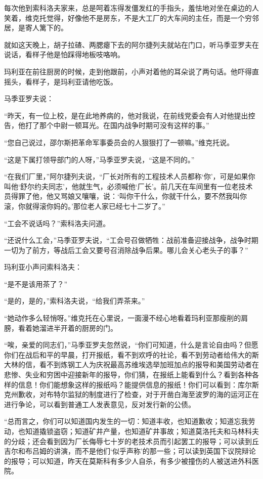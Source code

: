 每次他到索科洛夫家来，总是呵着冻得发僵发红的手指头，羞怯地对坐在桌边的人笑着，维克托觉得，好像他不是房东，不是大工厂的大车间的主任，而是一个穷邻居，是寄人篱下的。

就如这天晚上，胡子拉碴、两腮瘪下去的阿尔捷列夫就站在门口，听马季亚罗夫在说话，看样子他是怕踩得地板吱咯响。

玛利亚在前往厨房的时候，走到他跟前，小声对着他的耳朵说了两句话。他吓得直摇头，看样子，是玛利亚请他吃饭。

马季亚罗夫说：

“昨天，有一位上校，是在此地养病的，他对我说，在前线党委会有人对他提出控告，他打了那个中尉一顿耳光。在国内战争时期可没有这样的事。”

“您自己说过，邵尔斯把革命军事委员会的人狠狠打了一顿嘛。”维克托说。

“这是下属打领导部门的人呀，”马季亚罗夫说，“这是不同的。”

“在我们厂里，”阿尔捷列夫说，“厂长对所有的工程技术人员都称‘你’，可是如果你叫他‘舒尔约夫同志’，他就生气，必须喊他‘厂长’。前几天在车间里有一位老技术员得罪了他，他又骂娘又嚷嚷，说：‘叫你干什么，你就干什么，要不然我叫你滚，你就得滚你妈的。’那位老人家已经七十二岁了。”

“工会不说话吗？”索科洛夫问道。

“还说什么工会，”马季亚罗夫说，“工会号召做牺牲：战前准备迎接战争，战争时期一切为了前方，等战后工会又要号召消除战争后果。哪儿会关心老头子的事？”

玛利亚小声问索科洛夫：

“是不是该用茶了？”

“是的，是的，”索科洛夫说，“给我们弄茶来。”

“她动作多么轻悄呀。”维克托在心里说，一面漫不经心地看着玛利亚那瘦削的肩膀，看着她溜进半开着的厨房的门。

“唉，亲爱的同志们，”马季亚罗夫忽然说，“你们可知道，什么是言论自由吗？但愿你们在战后和平的早晨，打开报纸，看不到欢呼的社论，看不到劳动者给伟大的斯大林的信，看不到炼钢工人为庆祝最高苏维埃选举加班加点的报导和美国劳动者在悲惨、失业和穷困中迎接新年的报导，你们猜，在报纸上能看到什么？看到各种各样的信息！你们能想象这样的报纸吗？能提供信息的报纸！你们可以看到：库尔斯克州歉收，对布特尔监狱的制度进行了检查，对于开凿白海至波罗的海的运河正在进行争论，可以看到普通工人发表意见，反对发行新的公债。

“总而言之，你们可以知道国内发生的一切：知道丰收，也知道歉收；知道忘我劳动，也知道撬锁盗窃；知道矿井产量，也知道矿井事故；知道莫洛托夫和马林科夫的分歧；还会看到因为厂长侮辱七十岁的老技术员而引起罢工的报导；可以读到丘吉尔和布吕姆的讲演，而不是他们‘似乎声称’的那一些；可以读到英国下议院辩论的报导；可以知道，昨天在莫斯科有多少人自杀，有多少被撞伤的人被送进外科医院。

